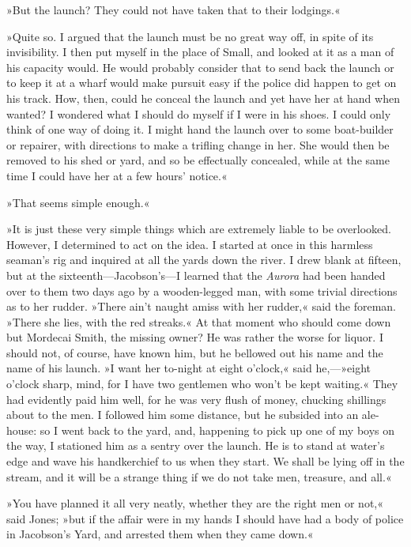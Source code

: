 »But the launch? They could not have taken that to their lodgings.«

»Quite so. I argued that the launch must be no great way off, in spite of its invisibility. I then put myself in the place of Small, and looked at it as a man of his capacity would. He would probably consider that to send back the launch or to keep it at a wharf would make pursuit easy if the police did happen to get on his track. How, then, could he conceal the launch and yet have her at hand when wanted? I wondered what I should do myself if I were in his shoes. I could only think of one way of doing it. I might hand the launch over to some boat-builder or repairer, with directions to make a trifling change in her. She would then be removed to his shed or yard, and so be effectually concealed, while at the same time I could have her at a few hours' notice.«

»That seems simple enough.«

»It is just these very simple things which are extremely liable to be overlooked. However, I determined to act on the idea. I started at once in this harmless seaman's rig and inquired at all the yards down the river. I drew blank at fifteen, but at the sixteenth—Jacobson's—I learned that the \textit{Aurora} had been handed over to them two days ago by a wooden-legged man, with some trivial directions as to her rudder. »There ain't naught amiss with her rudder,« said the foreman. »There she lies, with the red streaks.« At that moment who should come down but Mordecai Smith, the missing owner? He was rather the worse for liquor. I should not, of course, have known him, but he bellowed out his name and the name of his launch. »I want her to-night at eight o'clock,« said he,—»eight o'clock sharp, mind, for I have two gentlemen who won't be kept waiting.« They had evidently paid him well, for he was very flush of money, chucking shillings about to the men. I followed him some distance, but he subsided into an ale-house: so I went back to the yard, and, happening to pick up one of my boys on the way, I stationed him as a sentry over the launch. He is to stand at water's edge and wave his handkerchief to us when they start. We shall be lying off in the stream, and it will be a strange thing if we do not take men, treasure, and all.«

»You have planned it all very neatly, whether they are the right men or not,« said Jones; »but if the affair were in my hands I should have had a body of police in Jacobson's Yard, and arrested them when they came down.«

